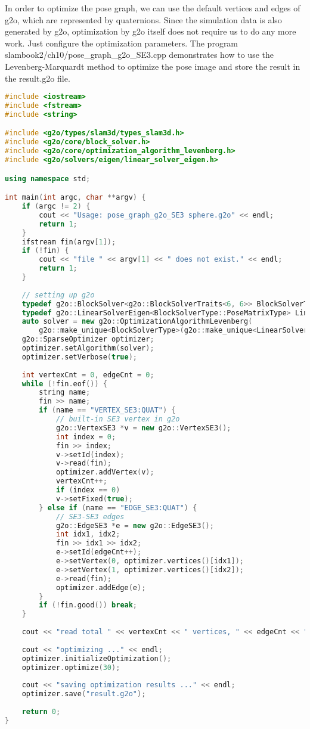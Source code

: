 In order to optimize the pose graph, we can use the default vertices and edges of g2o, which are represented by quaternions. Since the simulation data is also generated by g2o, optimization by g2o itself does not require us to do any more work. Just configure the optimization parameters. The program slambook2/ch10/pose\_graph\_g2o\_SE3.cpp demonstrates how to use the Levenberg-Marquardt method to optimize the pose image and store the result in the result.g2o file.

\begin{lstlisting}[language=c++,caption=slambook2/ch10/pose\_graph\_g2o\_SE3.cpp]
#include <iostream>
#include <fstream>
#include <string>

#include <g2o/types/slam3d/types_slam3d.h>
#include <g2o/core/block_solver.h>
#include <g2o/core/optimization_algorithm_levenberg.h>
#include <g2o/solvers/eigen/linear_solver_eigen.h>

using namespace std;

int main(int argc, char **argv) {
	if (argc != 2) {
		cout << "Usage: pose_graph_g2o_SE3 sphere.g2o" << endl;
		return 1;
	}
	ifstream fin(argv[1]);
	if (!fin) {
		cout << "file " << argv[1] << " does not exist." << endl;
		return 1;
	}
	
	// setting up g2o
	typedef g2o::BlockSolver<g2o::BlockSolverTraits<6, 6>> BlockSolverType;
	typedef g2o::LinearSolverEigen<BlockSolverType::PoseMatrixType> LinearSolverType;
	auto solver = new g2o::OptimizationAlgorithmLevenberg(
		g2o::make_unique<BlockSolverType>(g2o::make_unique<LinearSolverType>()));
	g2o::SparseOptimizer optimizer;     
	optimizer.setAlgorithm(solver);   
	optimizer.setVerbose(true);       
	
	int vertexCnt = 0, edgeCnt = 0;
	while (!fin.eof()) {
		string name;
		fin >> name;
		if (name == "VERTEX_SE3:QUAT") {
			// built-in SE3 vertex in g2o
			g2o::VertexSE3 *v = new g2o::VertexSE3();
			int index = 0;
			fin >> index;
			v->setId(index);
			v->read(fin);
			optimizer.addVertex(v);
			vertexCnt++;
			if (index == 0)
			v->setFixed(true);
		} else if (name == "EDGE_SE3:QUAT") {
			// SE3-SE3 edges
			g2o::EdgeSE3 *e = new g2o::EdgeSE3();
			int idx1, idx2;    
			fin >> idx1 >> idx2;
			e->setId(edgeCnt++);
			e->setVertex(0, optimizer.vertices()[idx1]);
			e->setVertex(1, optimizer.vertices()[idx2]);
			e->read(fin);
			optimizer.addEdge(e);
		}
		if (!fin.good()) break;
	}
	
	cout << "read total " << vertexCnt << " vertices, " << edgeCnt << " edges." << endl;
	
	cout << "optimizing ..." << endl;
	optimizer.initializeOptimization();
	optimizer.optimize(30);
	
	cout << "saving optimization results ..." << endl;
	optimizer.save("result.g2o");
	
	return 0;
}
\end{lstlisting}

